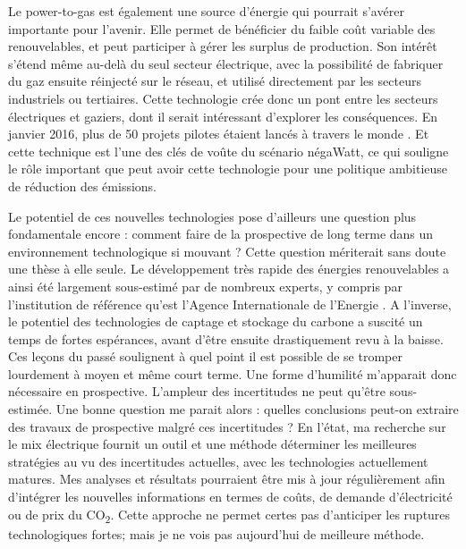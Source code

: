 Le power-to-gas est également une source d’énergie qui pourrait s’avérer importante pour l’avenir. Elle permet de bénéficier du faible coût variable des renouvelables, et peut participer à gérer les surplus de production. Son intérêt s’étend même au-delà du seul secteur électrique, avec la possibilité de fabriquer du gaz ensuite réinjecté sur le réseau, et utilisé directement par les secteurs industriels ou tertiaires. Cette technologie crée donc un pont entre les secteurs électriques et gaziers, dont il serait intéressant d’explorer les conséquences. En janvier 2016, plus de 50 projets pilotes étaient lancés à travers le monde \citep{EneaConsulting2016}. Et cette technique est l’une des clés de voûte du scénario négaWatt, ce qui souligne le rôle important que peut avoir cette technologie pour une politique ambitieuse de réduction des émissions.

Le potentiel de ces nouvelles technologies pose d'ailleurs une question plus fondamentale encore : comment faire de la prospective de long terme dans un environnement technologique si mouvant ? Cette question mériterait sans doute une thèse à elle seule. Le développement très rapide des énergies renouvelables a ainsi été largement sous-estimé par de nombreux experts, y compris par l'institution de référence qu'est l'Agence Internationale de l'Energie \citep{Metayer2015}. A l'inverse, le potentiel des technologies de captage et stockage du carbone a suscité un temps de fortes espérances, avant d'être ensuite drastiquement revu à la baisse. Ces leçons du passé soulignent à quel point il est possible de se tromper lourdement à moyen et même court terme. Une forme d'humilité m'apparait donc nécessaire en prospective. L'ampleur des incertitudes ne peut qu'être sous-estimée. Une bonne question me parait alors : quelles conclusions peut-on extraire des travaux de prospective malgré ces incertitudes ? 
En l'état, ma recherche sur le mix électrique fournit un outil et une méthode déterminer les meilleures stratégies au vu des incertitudes actuelles, avec les technologies actuellement matures. Mes analyses et résultats pourraient être mis à jour régulièrement afin d’intégrer les nouvelles informations en termes de coûts, de demande d’électricité ou de prix du CO\textsubscript{2}. Cette approche ne permet certes pas d'anticiper les ruptures technologiques fortes; mais je ne vois pas aujourd'hui de meilleure méthode.

